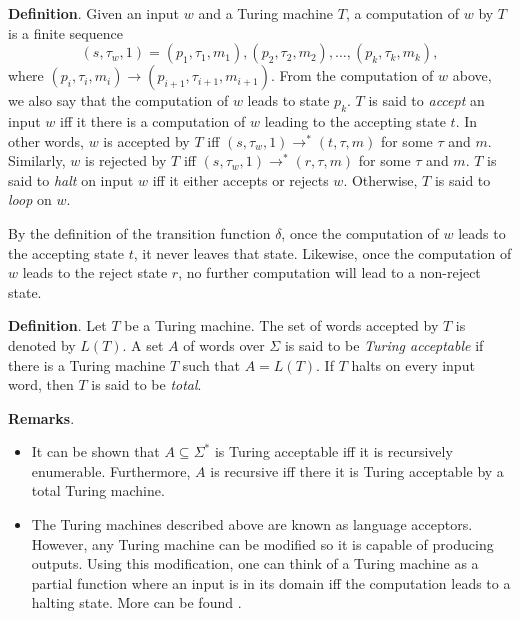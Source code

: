 \documentclass[12pt]{article}
\begin{document}
\textbf{Definition}.  Given an input $w$ and a Turing machine $T$, a computation of $w$ by $T$ is a finite sequence $$(s,\tau_w,1)=(p_1,\tau_1,m_1), (p_2,\tau_2,m_2), \ldots, (p_k,\tau_k, m_k),$$
where $(p_i,\tau_i,m_i)\rightarrow (p_{i+1},\tau_{i+1},m_{i+1})$.  From the computation of $w$ above, we also say that the computation of $w$ leads to state $p_k$.  $T$ is said to \emph{accept} an input $w$ iff it there is a computation of $w$ leading to the accepting state $t$.  In other words, $w$ is accepted by $T$ iff $(s,\tau_w,1)\rightarrow^* (t,\tau,m)$ for some $\tau$ and $m$.  Similarly, $w$ is rejected by $T$ iff $(s,\tau_w,1)\rightarrow^* (r,\tau,m)$ for some $\tau$ and $m$.  $T$ is said to \emph{halt} on input $w$ iff it either accepts or rejects $w$.  Otherwise, $T$ is said to \emph{loop} on $w$.

By the definition of the transition function $\delta$, once the computation of $w$ leads to the accepting state $t$, it never leaves that state.  Likewise, once the computation of $w$ leads to the reject state $r$, no further computation will lead to a non-reject state.

\textbf{Definition}.  Let $T$ be a Turing machine.  The set of words accepted by $T$ is denoted by $L(T)$.  A set $A$ of words over $\Sigma$ is said to be \emph{Turing acceptable} if there is a Turing machine $T$ such that $A=L(T)$.  If $T$ halts on every input word, then $T$ is said to be \emph{total}.

\textbf{Remarks}.  
\begin{itemize}
\item
It can be shown that $A\subseteq \Sigma^*$ is Turing acceptable iff it is recursively enumerable.  Furthermore, $A$ is recursive iff there it is Turing acceptable by a total Turing machine.
\item
The Turing machines described above are known as language acceptors.  However, any Turing machine can be modified so it is capable of producing outputs.  Using this modification, one can think of a Turing machine as a partial function where an input is in its domain iff the computation leads to a halting state.  More can be found .
\end{itemize}
\end{document}
